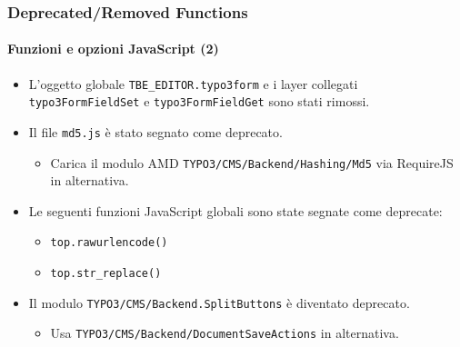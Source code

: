 \begin{frame}[fragile]
	\frametitle{Deprecated/Removed Functions}
	\framesubtitle{Funzioni e opzioni JavaScript (2)}

	\begin{itemize}

		\item L'oggetto globale \texttt{TBE\_EDITOR.typo3form} e i layer collegati \texttt{typo3FormFieldSet}
			e \texttt{typo3FormFieldGet} sono stati rimossi.

		\item Il file \texttt{md5.js} è stato segnato come deprecato.

			\begin{itemize}\smaller
				\item[\ding{228}] Carica il modulo AMD \texttt{TYPO3/CMS/Backend/Hashing/Md5} via RequireJS in alternativa.
			\end{itemize}\normalsize

		\item Le seguenti funzioni JavaScript globali sono state segnate come deprecate:

		\begin{itemize}
			\item \texttt{top.rawurlencode()}
			\item \texttt{top.str\_replace()}
		\end{itemize}

		\item Il modulo \texttt{TYPO3/CMS/Backend.SplitButtons} è diventato deprecato.

			\begin{itemize}\smaller
				\item[\ding{228}] Usa \texttt{TYPO3/CMS/Backend/DocumentSaveActions} in alternativa.
			\end{itemize}\normalsize

 	\end{itemize}

\end{frame}


